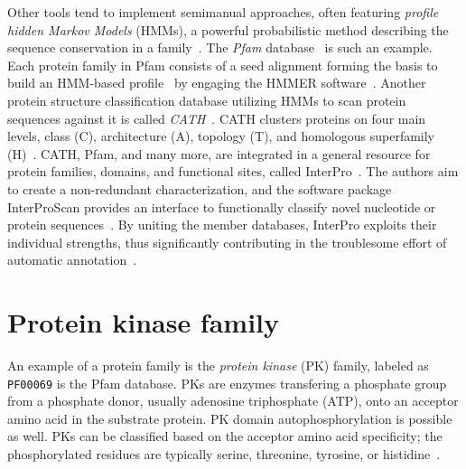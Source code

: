   Other tools tend to implement semimanual approaches, often featuring
  \emph{profile hidden Markov Models} (HMMs), a powerful probabilistic method describing
  the sequence conservation in a family~\cite{krogh1994hidden, eddy1996hidden}.
  The \emph{Pfam} database~\cite{sonnhammer1997pfam} is such an example.
  Each protein family in Pfam consists of a seed alignment forming the basis to
  build an HMM-based profile~\cite{el2019pfam} by engaging the HMMER
  software~\cite{finn2010pfam, finn2011hmmer}.
  Another protein structure classification database utilizing HMMs to scan protein
  sequences against it is called \emph{CATH}~\cite{dawson2017cath}.
  CATH clusters proteins on four main levels, class (C), architecture (A), topology (T),
  and homologous superfamily (H)~\cite{orengo1997cath}.
  CATH, Pfam, and many more, are integrated in a general resource for protein families,
  domains, and functional sites, called InterPro~\cite{finn2017interpro}.
  The authors aim to create a non-redundant characterization, and the software package
  InterProScan provides an interface to functionally classify novel nucleotide or protein
  sequences~\cite{zdobnov2001interproscan}.
  By uniting the member databases, InterPro exploits their individual strengths, thus
  significantly contributing in the troublesome effort of automatic
  annotation~\cite{apweiler2000interpro}.


\section{Protein kinase family}
\label{intro:pkinase}

  An example of a protein family is the \emph{protein kinase} (PK) family, labeled as
  \texttt{PF00069} is the Pfam database.
  PKs are enzymes transfering a phosphate group from a phosphate donor, usually
  adenosine triphosphate (ATP), onto an acceptor amino acid in the substrate protein.
  PK domain autophosphorylation is possible as well.
  PKs can be classified based on the acceptor amino acid specificity; the phosphorylated
  residues are typically serine, threonine, tyrosine, or histidine~\cite{hunter19911}.

